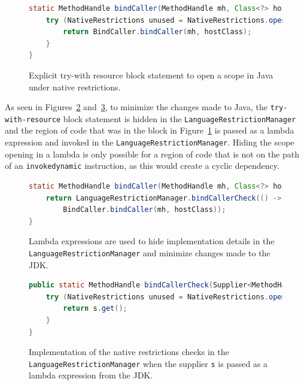 \begin{figure}[ht]
    \centering
\begin{lstlisting}[language=Java]
static MethodHandle bindCaller(MethodHandle mh, Class<?> hostClass) {
    try (NativeRestrictions unused = NativeRestrictions.openScope()) {
        return BindCaller.bindCaller(mh, hostClass);
    }
}
\end{lstlisting}
    \caption{Explicit try-with resource block statement to open a scope in Java under native restrictions.}
    \label{fig:bind_caller_twr}
\end{figure}

As seen in Figures~\ref{fig:bind_caller_lambda} and~\ref{fig:bind_caller_lrm}, to minimize the changes made to Java, the \verb|try-with-resource| block statement is hidden in the \verb|LanguageRestrictionManager| and the region of code that was in the block in Figure~\ref{fig:bind_caller_twr} is passed as a lambda expression and invoked in the \verb|LanguageRestrictionManager|. Hiding the scope opening in a lambda is only possible for a region of code that is not on the path of an \verb|invokedynamic| instruction, as this would create a cyclic dependency. 

\begin{figure}[ht]
    \centering
\begin{lstlisting}[language=Java]
static MethodHandle bindCaller(MethodHandle mh, Class<?> hostClass) {
    return LanguageRestrictionManager.bindCallerCheck(() -> 
        BindCaller.bindCaller(mh, hostClass));
}
\end{lstlisting}
    \caption{Lambda expressions are used to hide implementation details in the \texttt{LanguageRestrictionManager} and minimize changes made to the JDK.}
    \label{fig:bind_caller_lambda}
\end{figure}

\begin{figure}[ht]
    \centering
\begin{lstlisting}[language=Java]
public static MethodHandle bindCallerCheck(Supplier<MethodHandle> s) {
    try (NativeRestrictions unused = NativeRestrictions.openScope()) {
        return s.get();
    }
}
\end{lstlisting}
    \caption{Implementation of the native restrictions checks in the \texttt{LanguageRestrictionManager} when the supplier \texttt{s} is passed as a lambda expression from the JDK.}
    \label{fig:bind_caller_lrm}
\end{figure}

